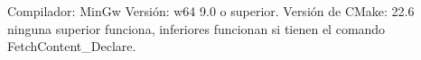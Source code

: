 Compilador: MinGw Versión: w64 9.0 o superior.
Versión de CMake: 22.6 ninguna superior funciona, inferiores funcionan si tienen el comando FetchContent_Declare.